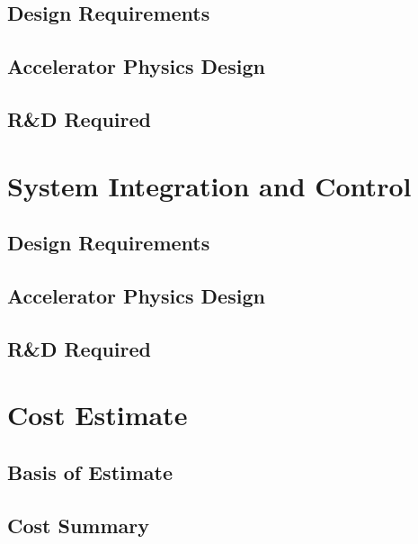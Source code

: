 \documentclass[10pt]{article}
\newcommand{\blankline}{\quad\pagebreak[3]}
\begin{document}
  \subsection{Design Requirements}
  
  \subsection{Accelerator Physics Design}
  
  \subsection{R\&D Required}  


\blankline
\blankline

\section{System Integration and Control}

  \subsection{Design Requirements}
  
  \subsection{Accelerator Physics Design}
  
  \subsection{R\&D Required}  


\blankline
\blankline


\section{Cost Estimate}

  \subsection{Basis of Estimate}
  
  \subsection{Cost Summary}






%
%
%
%
\end{document}
